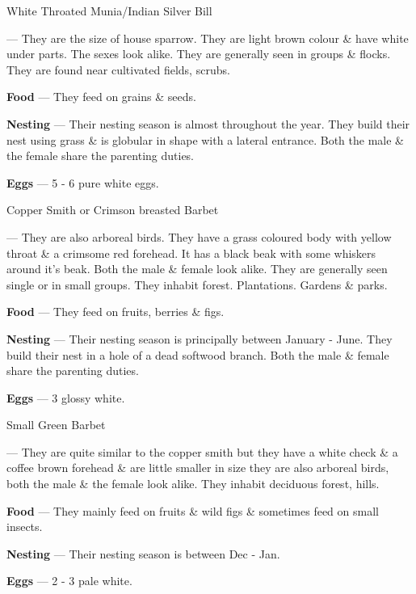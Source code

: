 \begin{bird}{White Throated Munia/Indian Silver Bill}

 --- They are the size of house sparrow. They are light brown colour \& have white under parts. The sexes look alike. They are generally seen in groups \& flocks. They are found near cultivated fields, scrubs. 

{\large\bf Food} --- They feed on grains \& seeds.

{\large\bf Nesting} --- Their nesting season is almost throughout the year. They build their nest using grass \& is globular in shape with a lateral entrance. Both the male \& the female share the parenting duties.

{\large\bf Eggs} --- 5 - 6 pure white eggs.
\end{bird}

\begin{bird}{Copper Smith or Crimson breasted Barbet}

 --- They are also arboreal birds. They have a grass coloured body with yellow throat \& a crimsome red forehead. It has a black beak with some whiskers around it's beak. Both the male \& female look alike. They are generally seen single or in small groups. They inhabit forest. Plantations. Gardens \& parks.

{\large\bf Food} --- They feed on fruits, berries \& figs.

{\large\bf Nesting} --- Their nesting season is principally between January - June. They build their nest in a hole of a dead softwood branch. Both the male \& female share the parenting duties.

{\large\bf Eggs} --- 3 glossy white.
\end{bird}

\begin{bird}{Small Green Barbet}

 --- They are quite similar to the copper smith but they have a white check \& a coffee brown forehead \& are little smaller in size they are also arboreal birds, both the male \& the female look alike. They inhabit deciduous forest, hills.

{\large\bf Food} --- They mainly feed on fruits \& wild figs \& sometimes feed on small insects.

{\large\bf Nesting} --- Their nesting season is between Dec - Jan.

{\large\bf Eggs} --- 2 - 3 pale white.
\end{bird}


